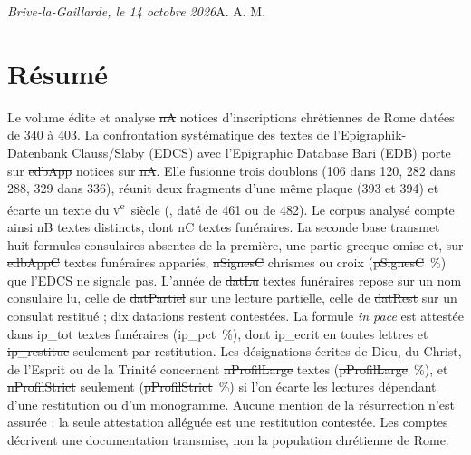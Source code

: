 \vfill
\noindent\emph{Brive-la-Gaillarde, le 14 octobre 2026}\hfill A. A. M.

\chapter*{Résumé}

Le volume édite et analyse \st{nA} notices d’inscriptions chrétiennes de Rome datées de 340 à 403. La confrontation systématique des textes de l’Epigraphik-Datenbank Clauss/Slaby (EDCS) avec l’Epigraphic Database Bari (EDB) porte sur \st{edbApp} notices sur \st{nA}. Elle fusionne trois doublons (106 dans 120, 282 dans 288, 329 dans 336), réunit deux fragments d’une même plaque (393 et 394) et écarte un texte du \textsc{v}\textsuperscript{e}~siècle (, daté de 461 ou de 482). Le corpus analysé compte ainsi \st{nB} textes distincts, dont \st{nC} textes funéraires. La seconde base transmet huit formules consulaires absentes de la première, une partie grecque omise et, sur \st{edbAppC} textes funéraires appariés, \st{nSignesC} chrismes ou croix (\st{pSignesC}~\%) que l’EDCS ne signale pas. L’année de \st{datLu} textes funéraires repose sur un nom consulaire lu, celle de \st{datPartiel} sur une lecture partielle, celle de \st{datRest} sur un consulat restitué ; dix datations restent contestées. La formule \emph{in pace} est attestée dans \st{ip_tot} textes funéraires (\st{ip_pct}~\%), dont \st{ip_ecrit} en toutes lettres et \st{ip_restitue} seulement par restitution. Les désignations écrites de Dieu, du Christ, de l’Esprit ou de la Trinité concernent \st{nProfilLarge} textes (\st{pProfilLarge}~\%), et \st{nProfilStrict} seulement (\st{pProfilStrict}~\%) si l’on écarte les lectures dépendant d’une restitution ou d’un monogramme. Aucune mention de la résurrection n’est assurée : la seule attestation alléguée est une restitution contestée. Les comptes décrivent une documentation transmise, non la population chrétienne de Rome.

